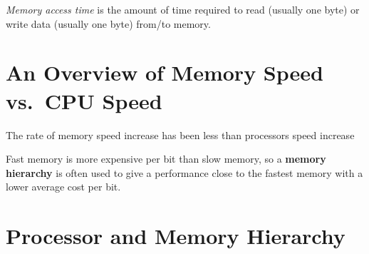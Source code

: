 \documentclass[
  12pt,
  a4paper,
]{report}
\begin{document}
\emph{Memory access time} is the amount of time required to read
(usually one byte) or write data (usually one byte) from/to memory.

\section{An Overview of Memory Speed vs.~CPU
Speed}\label{an-overview-of-memory-speed-vs.-cpu-speed}

The rate of memory speed increase has been less than processors speed
increase

Fast memory is more expensive per bit than slow memory, so a
\textbf{memory hierarchy} is often used to give a performance close to
the fastest memory with a lower average cost per bit.

\section{Processor and Memory
Hierarchy}\label{processor-and-memory-hierarchy}
\end{document}
